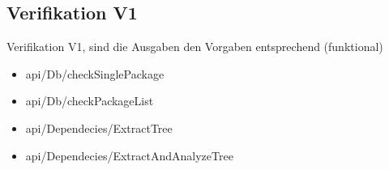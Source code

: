 \subsection{Verifikation V1} \label{sec:Ver1}
    Verifikation V1, sind die Ausgaben den Vorgaben entsprechend (funktional)
    \begin{itemize}
        \item api/Db/checkSinglePackage
        \item api/Db/checkPackageList
        \item api/Dependecies/ExtractTree
        \item api/Dependecies/ExtractAndAnalyzeTree
    \end{itemize}